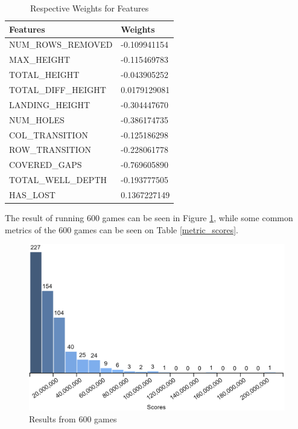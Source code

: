 \documentclass[a4paper,12pt,twocolumn]{article}
\begin{document}
\begin{table}[h]
    \begin{tabular}{|l|l|}
        \hline
        \textbf{Features}   & \textbf{Weights}     \\
        \hline
        NUM\_ROWS\_REMOVED  & -0.109941154 \\
        \hline
        MAX\_HEIGHT         & -0.115469783  \\
        \hline
        TOTAL\_HEIGHT       & -0.043905252 \\
        \hline
        TOTAL\_DIFF\_HEIGHT & 0.0179129081 \\
        \hline
        LANDING\_HEIGHT     & -0.304447670  \\
        \hline
        NUM\_HOLES          & -0.386174735 \\
        \hline
        COL\_TRANSITION     & -0.125186298 \\
        \hline
        ROW\_TRANSITION     & -0.228061778 \\
        \hline
        COVERED\_GAPS       & -0.769605890  \\
        \hline
        TOTAL\_WELL\_DEPTH  & -0.193777505 \\
        \hline
        HAS\_LOST           & 0.1367227149  \\
        \hline
    \end{tabular}
    \caption{Respective Weights for Features}
    \label{feature_weights}
\end{table}

The result of running 600 games can be seen in Figure \ref{score_histogram},
while some common metrics of the 600 games can be seen on Table \ref{metric_scores}.

\begin{figure}[h]
    \centering
    \includegraphics[scale=0.15]{games_600_histogram.png}
    \caption{Results from 600 games}
    \label{score_histogram}
\end{figure}
\end{document}
